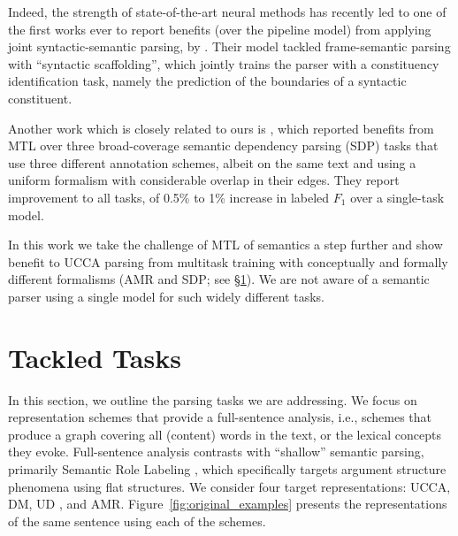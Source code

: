 \documentclass[11pt,a4paper]{article}
\begin{document}
Indeed, the strength of state-of-the-art neural methods has recently led to 
one of the first works ever to report benefits (over the pipeline model) from 
applying joint syntactic-semantic parsing, by \citet{swayamdipta2017frame}.
Their model tackled frame-semantic parsing with ``syntactic scaffolding'',
which jointly trains the parser with a constituency identification task, 
namely the prediction of the boundaries of a syntactic
constituent. 

Another work which is closely related to ours is \citet{P17-1186},
which reported benefits from MTL over three broad-coverage semantic dependency parsing (SDP)
tasks that use three different annotation schemes, albeit on the same text and using a uniform formalism with 
considerable overlap in their edges.
They report improvement to all tasks, of 0.5\% to 1\% increase in labeled $F_1$ over a single-task model.

In this work we take the challenge of MTL of semantics a step further and 
show benefit to UCCA parsing from multitask 
training with conceptually and formally different formalisms (AMR and SDP; see \S\ref{sec:tasks}).
We are not aware of a semantic parser using a single model for
such widely different tasks.




\section{Tackled Tasks}\label{sec:tasks}

In this section, we outline the parsing tasks we are addressing.
We focus on representation schemes that provide a full-sentence analysis,
i.e., schemes that produce a graph covering all (content) words in the text, 
or the lexical concepts they evoke.
Full-sentence analysis contrasts with ``shallow'' semantic parsing,
primarily Semantic Role Labeling
\cite[SRL;][]{Palmer:05,gildea2002automatic,swayamdipta2017frame,ringgaard2017sling},
which specifically targets argument structure phenomena using flat structures.
We consider four target representations: UCCA, DM, UD
\cite[Universal Dependencies; ][]{nivre2016universal}, and AMR.
Figure~\ref{fig:original_examples} presents the representations of the same sentence 
using each of the schemes.
\end{document}
